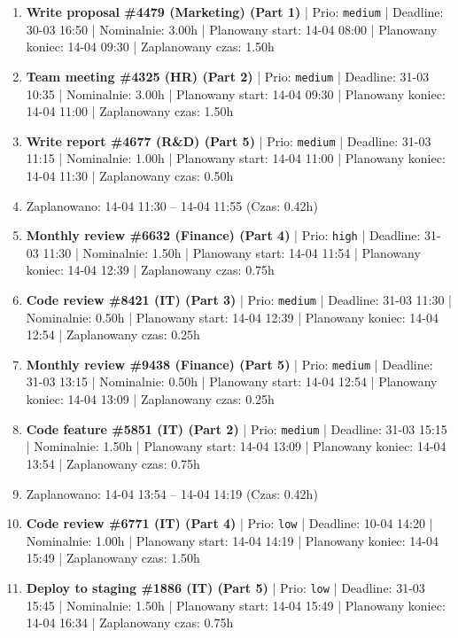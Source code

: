 {\begin{enumerate}
  \item [\textbf{14660}] \textbf{Write proposal \#4479 (Marketing) (Part 1)} | Prio: \texttt{medium} | Deadline: 30-03 16:50 | Nominalnie: 3.00h | Planowany start: 14-04 08:00 | Planowany koniec: 14-04 09:30 | Zaplanowany czas: 1.50h
  \item [\textbf{14641}] \textbf{Team meeting \#4325 (HR) (Part 2)} | Prio: \texttt{medium} | Deadline: 31-03 10:35 | Nominalnie: 3.00h | Planowany start: 14-04 09:30 | Planowany koniec: 14-04 11:00 | Zaplanowany czas: 1.50h
  \item [\textbf{14640}] \textbf{Write report \#4677 (R\&D) (Part 5)} | Prio: \texttt{medium} | Deadline: 31-03 11:15 | Nominalnie: 1.00h | Planowany start: 14-04 11:00 | Planowany koniec: 14-04 11:30 | Zaplanowany czas: 0.50h
  \item [\textbf{PRZERWA}] Zaplanowano: 14-04 11:30 -- 14-04 11:55 (Czas: 0.42h)
  \item [\textbf{14615}] \textbf{Monthly review \#6632 (Finance) (Part 4)} | Prio: \texttt{high} | Deadline: 31-03 11:30 | Nominalnie: 1.50h | Planowany start: 14-04 11:54 | Planowany koniec: 14-04 12:39 | Zaplanowany czas: 0.75h
  \item [\textbf{14665}] \textbf{Code review \#8421 (IT) (Part 3)} | Prio: \texttt{medium} | Deadline: 31-03 11:30 | Nominalnie: 0.50h | Planowany start: 14-04 12:39 | Planowany koniec: 14-04 12:54 | Zaplanowany czas: 0.25h
  \item [\textbf{14656}] \textbf{Monthly review \#9438 (Finance) (Part 5)} | Prio: \texttt{medium} | Deadline: 31-03 13:15 | Nominalnie: 0.50h | Planowany start: 14-04 12:54 | Planowany koniec: 14-04 13:09 | Zaplanowany czas: 0.25h
  \item [\textbf{14643}] \textbf{Code feature \#5851 (IT) (Part 2)} | Prio: \texttt{medium} | Deadline: 31-03 15:15 | Nominalnie: 1.50h | Planowany start: 14-04 13:09 | Planowany koniec: 14-04 13:54 | Zaplanowany czas: 0.75h
  \item [\textbf{PRZERWA}] Zaplanowano: 14-04 13:54 -- 14-04 14:19 (Czas: 0.42h)
  \item [\textbf{14681}] \textbf{Code review \#6771 (IT) (Part 4)} | Prio: \texttt{low} | Deadline: 10-04 14:20 | Nominalnie: 1.00h | Planowany start: 14-04 14:19 | Planowany koniec: 14-04 15:49 | Zaplanowany czas: 1.50h
  \item [\textbf{14697}] \textbf{Deploy to staging \#1886 (IT) (Part 5)} | Prio: \texttt{low} | Deadline: 31-03 15:45 | Nominalnie: 1.50h | Planowany start: 14-04 15:49 | Planowany koniec: 14-04 16:34 | Zaplanowany czas: 0.75h

\end{enumerate}}
